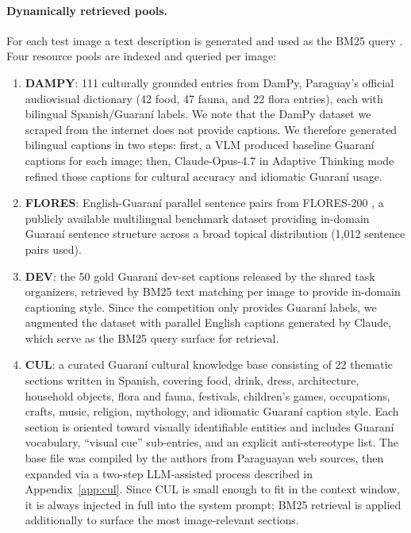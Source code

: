 \documentclass[11pt]{article}
\begin{document}
\paragraph{Dynamically retrieved pools.}
For each test image a text description is generated and used as the BM25 query \cite{robertson2009bm25}.
Four resource pools are indexed and queried per image:
\begin{enumerate}
\setlength{\itemsep}{2pt}
\setlength{\parsep}{0pt}
\item \textbf{DAMPY}: 111 culturally grounded entries from DamPy,
Paraguay's official audiovisual dictionary (42 food, 47 fauna, and 22 flora entries),
each with bilingual Spanish/Guaran\'{i} labels. We note that the DamPy dataset we
scraped from the internet does not provide captions. We therefore generated bilingual
captions in two steps: first, a VLM produced baseline Guaran\'{i} captions for each
image; then, Claude-Opus-4.7 in Adaptive Thinking mode refined those captions for
cultural accuracy and idiomatic Guaran\'{i} usage.
\item \textbf{FLORES}: English-Guaran\'{i} parallel sentence pairs from FLORES-200
    \cite{costa2022no}, a publicly available multilingual benchmark
    dataset providing in-domain Guaran\'{i} sentence structure across a broad
    topical distribution (1,012 sentence pairs used).
\item \textbf{DEV}: the 50 gold Guaran\'{i} dev-set captions released by the
shared task organizers, retrieved by BM25 text matching per image to provide
in-domain captioning style. Since the competition only provides Guaran\'{i}
labels, we augmented the dataset with parallel English captions generated
by Claude, which serve as the BM25 query surface for retrieval.
\item \textbf{CUL}: a curated Guaran\'{i} cultural knowledge base
    consisting of 22 thematic sections written in Spanish, covering food,
    drink, dress, architecture, household objects, flora and fauna,
    festivals, children's games, occupations, crafts, music, religion,
    mythology, and idiomatic Guaran\'{i} caption style. Each section is
    oriented toward visually identifiable entities and includes
    Guaran\'{i} vocabulary, ``visual cue'' sub-entries, and an explicit
    anti-stereotype list. The base file was compiled by the authors from
    Paraguayan web sources, then expanded via a two-step LLM-assisted
    process described in Appendix~\ref{app:cul}.
    Since CUL is small enough to fit in the context window, it is always
    injected in full into the system prompt; BM25 retrieval is applied
    additionally to surface the most image-relevant sections.
    \end{enumerate}
\end{document}
